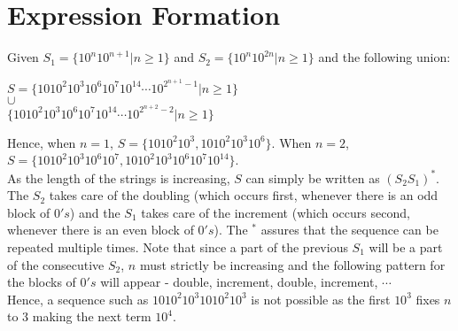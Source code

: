 \documentclass[11pt,letterpaper]{article}
\begin{document}
\section{Expression Formation}
Given $S_1 = \{ 10^{n}10^{n+1} | n \geq 1 \}$ and $S_2 = \{ 10^{n}10^{2n} | n \geq 1 \}$ and the following union:
\begin{center}
    $S = \{1010^{2}10^{3}10^{6}10^{7}10^{14}\cdots10^{2^{n+1}-1} | n \geq 1 \}$ \\
    $\cup$ \\
    $\{1010^{2}10^{3}10^{6}10^{7}10^{14}\cdots10^{2^{n+2}-2} | n \geq 1 \}$
\end{center}
Hence, when $n=1$, $S = \{1010^{2}10^{3}, 1010^{2}10^{3}10^{6}\}$. When $n=2$, $S = \{1010^{2}10^{3}10^{6}10^{7}, 1010^{2}10^{3}10^{6}10^{7}10^{14}\}$. \\
As the length of the strings is increasing, $S$ can simply be written as $(S_2S_1)^*$. The $S_2$ takes care of the doubling (which occurs first, whenever there is an odd block of $0's$) and the $S_1$ takes care of the increment (which occurs second, whenever there is an even block of $0's$). The $^*$ assures that the sequence can be repeated multiple times. Note that since a part of the previous $S_1$ will be a part of the consecutive $S_2$, $n$ must strictly be increasing and the following pattern for the blocks of $0's$ will appear - double, increment, double, increment, $\cdots$ \\
Hence, a sequence such as $1010^{2}10^{3}1010^{2}10^{3}$ is not possible as the first $10^{3}$ fixes $n$ to $3$ making the next term $10^{4}$.
\end{document}
